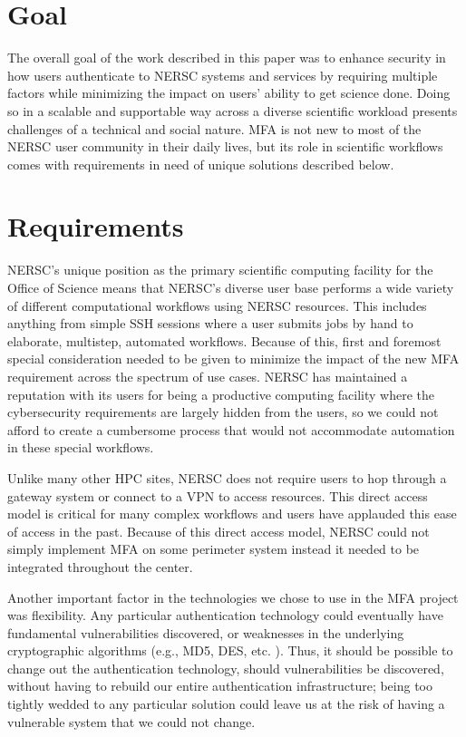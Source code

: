 \documentclass[sigconf,review]{acmart}
\begin{document}
\section{Goal}
\label{goal}

The overall goal of the work described in this paper was to enhance security in
how users authenticate to NERSC systems and services by requiring multiple
factors while minimizing the impact on users' ability to get science done. Doing
so in a scalable and supportable way across a diverse scientific workload
presents challenges of a technical and social nature. MFA is not new to most of
the NERSC user community in their daily lives, but its role in scientific
workflows comes with requirements in need of unique solutions described below.

\section{Requirements}
\label{reqs}

NERSC's unique position as the primary scientific computing facility for the
Office of Science means that NERSC's diverse user base performs a wide variety
of different computational workflows using NERSC resources. This includes
anything from simple SSH sessions where a user submits jobs by hand to
elaborate, multistep, automated workflows. Because of this, first and foremost
special consideration needed to be given to minimize the impact of the new MFA
requirement across the spectrum of use cases. NERSC has maintained a reputation
with its users for being a productive computing facility where the cybersecurity
requirements are largely hidden from the users, so we could not afford to create
a cumbersome process that would not accommodate automation in these special
workflows.

Unlike many other HPC sites, NERSC does not require users to hop through a
gateway system or connect to a VPN to access resources.  This direct access model 
is critical for many complex workflows and users have applauded this ease of access in the past.
Because of this direct access model, NERSC could not simply implement MFA on some
perimeter system instead it needed to be integrated throughout the center.

Another important factor in the technologies we chose to use in the MFA project
was flexibility. Any particular authentication technology could eventually have
fundamental vulnerabilities discovered, or weaknesses in the underlying
cryptographic algorithms (e.g., MD5, DES, etc. \cite{xie2013fast,
diffie1977special}). Thus, it should be possible to change out the
authentication technology, should vulnerabilities be discovered, without having
to rebuild our entire authentication infrastructure; being too tightly wedded to
any particular solution could leave us at the risk of having a vulnerable system
that we could not change.
\end{document}
